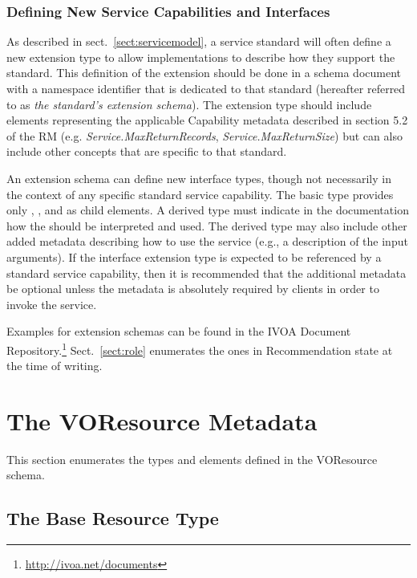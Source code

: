 \documentclass[11pt,a4paper]{ivoa}
\begin{document}
\subsubsection{Defining New Service Capabilities and Interfaces}
\label{sect:serviceelements}


As described in sect.~\ref{sect:servicemodel}, a service
standard will often define a new  extension
type to allow implementations to describe how they support the
standard.  This definition of the  extension
should be done in a schema document with a namespace identifier that
is dedicated to that standard (hereafter referred to as \emph{the
standard's extension schema}).  The extension type should include
elements representing the applicable Capability metadata described in
section 5.2 of the RM
(e.g. \emph{Service.MaxReturnRecords}, \emph{Service.MaxReturnSize})
but can also include other concepts that are specific to that standard.


An extension schema can define new interface types, though not
necessarily in the context of any specific standard service
capability.  The basic  type provides only
, , and  as child
elements.  A derived  type must indicate in
the documentation how the  should be
interpreted and used.  The derived type may also include other added
metadata describing how to use the service (e.g., a description of the
input arguments).  If the interface extension type is expected to be
referenced by a standard service capability, then it is recommended
that the additional metadata be optional unless the metadata is
absolutely required by clients in order to invoke the service.


Examples for extension schemas can be found in the IVOA Document
Repository.\footnote{\url{http://ivoa.net/documents}}
Sect.~\ref{sect:role} enumerates the ones in Recommendation state at the
time of writing.


\section{The VOResource Metadata}
\label{sect:metadata}


This section enumerates the types and elements defined in the
VOResource schema.


\subsection{The Base Resource Type}
\end{document}
